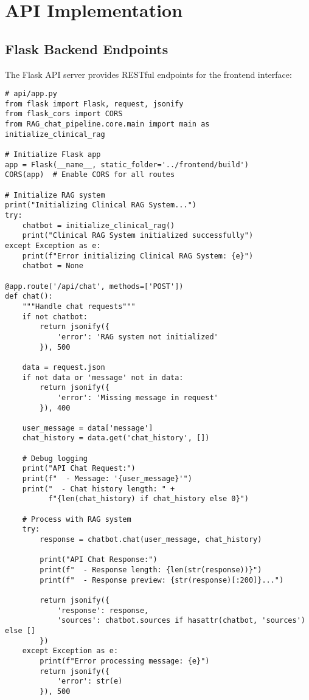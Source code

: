 \section{API Implementation}

\subsection{Flask Backend Endpoints}

The Flask API server provides RESTful endpoints for the frontend interface:

\begin{verbatim}
# api/app.py
from flask import Flask, request, jsonify
from flask_cors import CORS
from RAG_chat_pipeline.core.main import main as initialize_clinical_rag

# Initialize Flask app
app = Flask(__name__, static_folder='../frontend/build')
CORS(app)  # Enable CORS for all routes

# Initialize RAG system
print("Initializing Clinical RAG System...")
try:
    chatbot = initialize_clinical_rag()
    print("Clinical RAG System initialized successfully")
except Exception as e:
    print(f"Error initializing Clinical RAG System: {e}")
    chatbot = None

@app.route('/api/chat', methods=['POST'])
def chat():
    """Handle chat requests"""
    if not chatbot:
        return jsonify({
            'error': 'RAG system not initialized'
        }), 500

    data = request.json
    if not data or 'message' not in data:
        return jsonify({
            'error': 'Missing message in request'
        }), 400

    user_message = data['message']
    chat_history = data.get('chat_history', [])

    # Debug logging
    print("API Chat Request:")
    print(f"  - Message: '{user_message}'")
    print("  - Chat history length: " + 
          f"{len(chat_history) if chat_history else 0}")

    # Process with RAG system
    try:
        response = chatbot.chat(user_message, chat_history)
        
        print("API Chat Response:")
        print(f"  - Response length: {len(str(response))}")
        print(f"  - Response preview: {str(response)[:200]}...")

        return jsonify({
            'response': response,
            'sources': chatbot.sources if hasattr(chatbot, 'sources') else []
        })
    except Exception as e:
        print(f"Error processing message: {e}")
        return jsonify({
            'error': str(e)
        }), 500


\end{verbatim}
